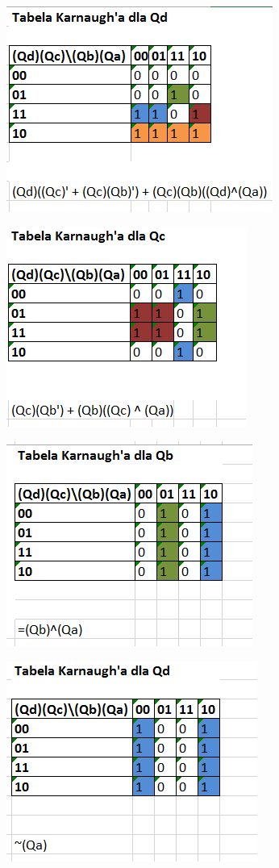 \documentclass[12pt,a4paper]{article}
\begin{document}
\begin{figure}[H]
\centering
\includegraphics{img/4c_table_4bit_qd}
\end{figure}

\begin{figure}[H]
\centering
\includegraphics{img/4c_table_4bit_qc}
\end{figure}

\begin{figure}[H]
\centering
\includegraphics{img/4c_table_4bit_qb}
\end{figure}

\begin{figure}[H]
\centering
\includegraphics{img/4c_table_4bit_qa}
\end{figure}
\end{document}
